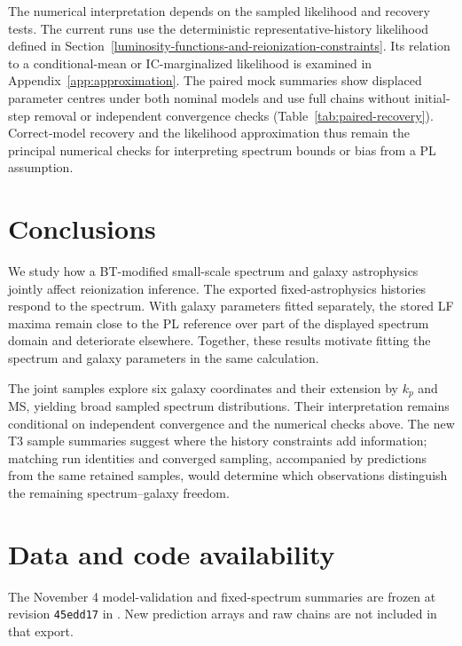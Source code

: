 The numerical interpretation depends on the sampled likelihood and recovery tests. The current runs use the deterministic representative-history likelihood defined in Section~\ref{luminosity-functions-and-reionization-constraints}. Its relation to a conditional-mean or IC-marginalized likelihood is examined in Appendix~\ref{app:approximation}. The paired mock summaries show displaced parameter centres under both nominal models and use full chains without initial-step removal or independent convergence checks (Table~\ref{tab:paired-recovery}). Correct-model recovery and the likelihood approximation thus remain the principal numerical checks for interpreting spectrum bounds or bias from a PL assumption.


\section{Conclusions}\label{conclusions}

We study how a BT-modified small-scale spectrum and galaxy astrophysics jointly affect reionization inference. The exported fixed-astrophysics histories respond to the spectrum. With galaxy parameters fitted separately, the stored LF maxima remain close to the PL reference over part of the displayed spectrum domain and deteriorate elsewhere. Together, these results motivate fitting the spectrum and galaxy parameters in the same calculation.

The joint samples explore six galaxy coordinates and their extension by $k_p$ and MS, yielding broad sampled spectrum distributions. Their interpretation remains conditional on independent convergence and the numerical checks above. The new T3 sample summaries suggest where the history constraints add information; matching run identities and converged sampling, accompanied by predictions from the same retained samples, would determine which observations distinguish the remaining spectrum--galaxy freedom.


\section*{Data and code availability}

The November 4 model-validation and fixed-spectrum summaries are frozen at revision \texttt{45edd17} in . New prediction arrays and raw chains are not included in that export.

